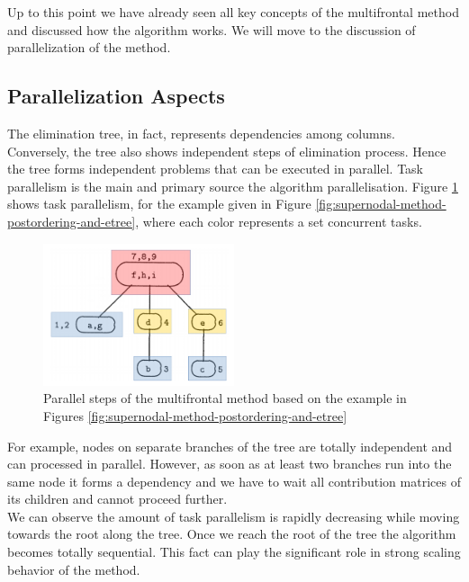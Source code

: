 Up to this point we have already seen all key concepts of the multifrontal method and discussed how the algorithm works. We will move to the discussion of parallelization of the method. \\



\subsection{Parallelization Aspects}
\label{subseq:direct-parallel-aspects}


The elimination tree, in fact, represents dependencies among columns. Conversely, the tree also shows independent steps of elimination process. Hence the tree forms independent problems that can be executed in parallel. Task parallelism is the main and primary source the algorithm parallelisation. Figure \ref{fig:elimination-tree-mm-parallel-steps} shows task parallelism, for the example given in Figure \ref{fig:supernodal-method-postordering-and-etree}, where each color represents a set concurrent tasks.\\


\figpointer{\ref{fig:elimination-tree-mm-parallel-steps}}

\begin{figure}[htpb]
  \centering
  \includegraphics[width=0.5\textwidth]{figures/chapter-2/elimination-tree-parallel.png}
\caption{Parallel steps of the multifrontal method based on the example in Figures \ref{fig:supernodal-method-postordering-and-etree}}
\label{fig:elimination-tree-mm-parallel-steps}
\end{figure}


For example, nodes on separate branches of the tree are totally independent and can processed in parallel. However, as soon as at least two branches run into the same node it forms a dependency and we have to wait all contribution matrices of its children and cannot proceed further.\\ 


We can observe the amount of task parallelism is rapidly decreasing while moving towards the root along the tree. Once we reach the root of the tree the algorithm becomes totally sequential. This fact can play the significant role in strong scaling behavior of the method.\\


